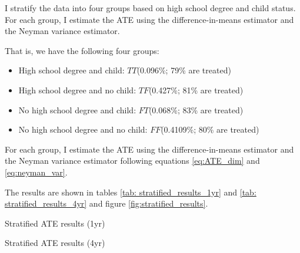 \documentclass[11pt]{article}
\numberwithin{equation}{section}
\begin{document}
I stratify the data into four groups based on high school degree and child status.
For each group, I estimate the ATE using the difference-in-means estimator and the Neyman variance estimator.

That is, we have the following four groups:
\begin{itemize}
    \item High school degree and child: $TT$(0.096\%; 79\% are treated)
    \item High school degree and no child: $TF$(0.427\%; 81\% are treated)
    \item No high school degree and child: $FT$(0.068\%; 83\% are treated)
    \item No high school degree and no child: $FF$(0.4109\%; 80\% are treated)
\end{itemize}

For each group, I estimate the ATE using the difference-in-means estimator and the Neyman variance estimator following equations
\eqref{eq:ATE_dim} and \eqref{eq:neyman_var}.

The results are shown in tables \ref{tab: stratified_results_1yr} and \ref{tab: stratified_results_4yr} and figure \ref{fig:stratified_results}.

\begin{table}[h]
    \centering
    \small
    
    \caption{\label{tab: stratified_results_1yr}Stratified ATE results (1yr)}
\end{table}

\begin{table}[h]
    \centering
    \small
    
    \caption{\label{tab: stratified_results_4yr}Stratified ATE results (4yr)}
\end{table}
\end{document}
